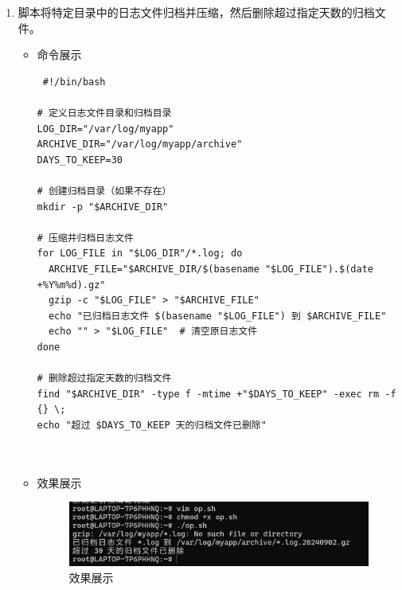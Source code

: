 \documentclass[UTF8]{ctexart}
\begin{document}
\begin{enumerate}
  \item 脚本将特定目录中的日志文件归档并压缩，然后删除超过指定天数的归档文件。
  \begin{itemize}
  \item 命令展示
  \begin{verbatim}
 #!/bin/bash

# 定义日志文件目录和归档目录
LOG_DIR="/var/log/myapp"
ARCHIVE_DIR="/var/log/myapp/archive"
DAYS_TO_KEEP=30

# 创建归档目录（如果不存在）
mkdir -p "$ARCHIVE_DIR"

# 压缩并归档日志文件
for LOG_FILE in "$LOG_DIR"/*.log; do
  ARCHIVE_FILE="$ARCHIVE_DIR/$(basename "$LOG_FILE").$(date +%Y%m%d).gz"
  gzip -c "$LOG_FILE" > "$ARCHIVE_FILE"
  echo "已归档日志文件 $(basename "$LOG_FILE") 到 $ARCHIVE_FILE"
  echo "" > "$LOG_FILE"  # 清空原日志文件
done

# 删除超过指定天数的归档文件
find "$ARCHIVE_DIR" -type f -mtime +"$DAYS_TO_KEEP" -exec rm -f {} \;
echo "超过 $DAYS_TO_KEEP 天的归档文件已删除"

    
  \end{verbatim}

  \item 效果展示
  \begin{figure}[H]
    \centering
    \includegraphics[width=\textwidth]{17} %
    \caption{效果展示}
  
  \end{figure}
\end{itemize}
\end{enumerate}




\end{document}

